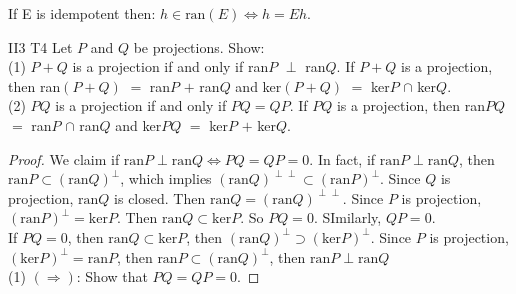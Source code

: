 \begin{lemma}{}{}
    If E is idempotent then:
    $h \in \text{ran}(E) \Leftrightarrow h = Eh$.
\end{lemma}


\begin{exercise}{II3 T4}{}
    Let $P$ and $Q$ be projections. Show:\\
    (1) $P+Q$ is a projection if and only if ran$P$ $\perp$ ran$Q$.
    If $P+Q$ is a projection, then ran$(P+Q)$ $=$ ran$P$ $+$ ran$Q$ and 
    ker$(P+Q)$ $=$ ker$P$ $\cap$ ker$Q$.\\
    (2) $PQ$ is a projection if and only if $PQ=QP$.
    If $PQ$ is a projection, then ran$PQ$ $=$ ran$P$ $\cap$ ran$Q$ 
    and ker$PQ$ $=$ ker$P$ $+$ ker$Q$.
\end{exercise}

\begin{proof}
    We claim if $\text{ran}P\perp \text{ran}Q\Leftrightarrow PQ=QP=0$.
    In fact, if $\text{ran}P\perp \text{ran}Q$, then $\text{ran}P\subset (\text{ran}Q)^{\perp}$,
    which implies $(\text{ran}Q)^{\perp\perp}\subset (\text{ran}P)^{\perp}$.
    Since $Q$ is projection, $\text{ran}Q$ is closed. Then $\text{ran}Q=(\text{ran}Q)^{\perp\perp}$.
    Since $P$ is projection, $(\text{ran}P)^{\perp}=\text{ker}P$.
    Then $\text{ran}Q\subset \text{ker}P$. So $PQ=0$. SImilarly, $QP=0$.\\
    If $PQ=0$, then $\text{ran}Q\subset \text{ker}P$, then $(\text{ran}Q)^{\perp}\supset (\text{ker}P)^{\perp}$.
    Since $P$ is projection, $(\text{ker}P)^{\perp}=\text{ran}P$, then $\text{ran}P\subset (\text{ran}Q)^{\perp}$,
    then $\text{ran}P\perp \text{ran}Q$\\
    (1)
    $(\Rightarrow)$: Show that $PQ=QP=0$. 
   

\end{proof}
